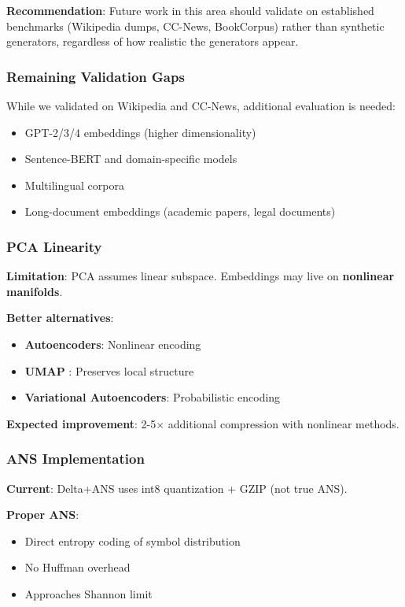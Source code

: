 \documentclass[11pt,a4paper]{article}
\begin{document}
\textbf{Recommendation}: Future work in this area should validate on established benchmarks (Wikipedia dumps, CC-News, BookCorpus) rather than synthetic generators, regardless of how realistic the generators appear.

\subsubsection{Remaining Validation Gaps}

While we validated on Wikipedia and CC-News, additional evaluation is needed:
\begin{itemize}
\item GPT-2/3/4 embeddings (higher dimensionality)
\item Sentence-BERT and domain-specific models
\item Multilingual corpora
\item Long-document embeddings (academic papers, legal documents)
\end{itemize}

\subsubsection{PCA Linearity}

\textbf{Limitation}: PCA assumes linear subspace. Embeddings may live on \textbf{nonlinear manifolds}.

\textbf{Better alternatives}:
\begin{itemize}
\item \textbf{Autoencoders}: Nonlinear encoding
\item \textbf{UMAP} \cite{mcinnes2018umap}: Preserves local structure
\item \textbf{Variational Autoencoders}: Probabilistic encoding
\end{itemize}

\textbf{Expected improvement}: 2-5$\times$ additional compression with nonlinear methods.

\subsubsection{ANS Implementation}

\textbf{Current}: Delta+ANS uses int8 quantization + GZIP (not true ANS).

\textbf{Proper ANS}:
\begin{itemize}
\item Direct entropy coding of symbol distribution
\item No Huffman overhead
\item Approaches Shannon limit
\end{itemize}
\end{document}
